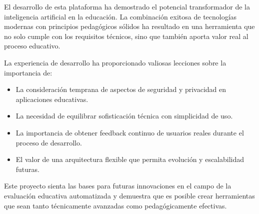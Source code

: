 \documentclass[12pt,a4paper]{report}
\begin{document}
El desarrollo de esta plataforma ha demostrado el potencial transformador de la inteligencia artificial en la educación. La combinación exitosa de tecnologías modernas con principios pedagógicos sólidos ha resultado en una herramienta que no solo cumple con los requisitos técnicos, sino que también aporta valor real al proceso educativo.

La experiencia de desarrollo ha proporcionado valiosas lecciones sobre la importancia de:

\begin{itemize}
\item La consideración temprana de aspectos de seguridad y privacidad en aplicaciones educativas.
\item La necesidad de equilibrar sofisticación técnica con simplicidad de uso.
\item La importancia de obtener feedback continuo de usuarios reales durante el proceso de desarrollo.
\item El valor de una arquitectura flexible que permita evolución y escalabilidad futuras.
\end{itemize}

Este proyecto sienta las bases para futuras innovaciones en el campo de la evaluación educativa automatizada y demuestra que es posible crear herramientas que sean tanto técnicamente avanzadas como pedagógicamente efectivas.
\end{document}
